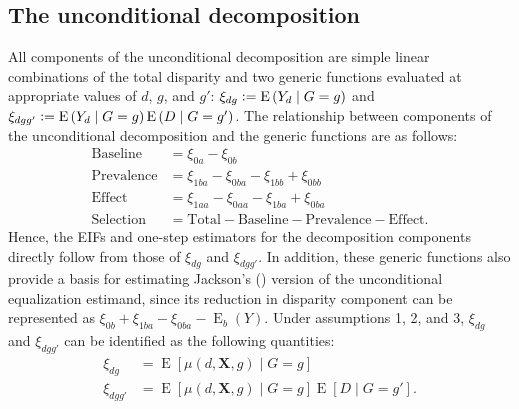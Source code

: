 \documentclass[12pt,a4paper]{article}
\newcommand{\E}{\operatorname{E}}
\def\X{{\boldsymbol X}}
\newcommand{\defeq}{\vcentcolon=}
\begin{document}
\subsection{The unconditional decomposition}
All components of the unconditional decomposition are simple linear combinations of the total disparity and two generic functions evaluated at appropriate values of $d$, $g$, and $g'$: $\xi_{dg} \defeq \E \left(Y_d \mid G=g  \right)$ and $\xi_{dgg'} \defeq \E \left(Y_d \mid G=g \right)\E \left(D \mid G=g' \right)$. The relationship between components of the unconditional decomposition and the generic functions are as follows:
\begin{align*}
    \text{Baseline} &= \xi_{0a}-\xi_{0b}  \\
    \text{Prevalence} &= \xi_{1ba}-\xi_{0ba}-\xi_{1bb}+\xi_{0bb} \\
    \text{Effect} &= \xi_{1aa}-\xi_{0aa} - \xi_{1ba}+\xi_{0ba} \\
    \text{Selection} &= \text{Total} - \text{Baseline} - \text{Prevalence} - \text{Effect} .
\end{align*}
Hence, the EIFs and one-step estimators for the decomposition components directly follow from those of $\xi_{dg}$ and $\xi_{dgg'}$. In addition, these generic functions also provide a basis for estimating Jackson's (\citeyear{jackson_decomposition_2018}) version of the unconditional equalization estimand, since its reduction in disparity component can be represented as $\xi_{0b} + \xi_{1ba}-\xi_{0ba}-\E_b(Y)$. Under assumptions 1, 2, and 3, $\xi_{dg}$ and $\xi_{dgg'}$ can be identified as the following quantities:
\begin{align*}
    \xi_{dg} &= \E \left[\mu(d,\X,g) \mid G=g \right] \\
    \xi_{dgg'} &= \E \left[\mu(d,\X,g) \mid G=g \right] \E \left[D \mid G=g' \right].
\end{align*}
\end{document}
